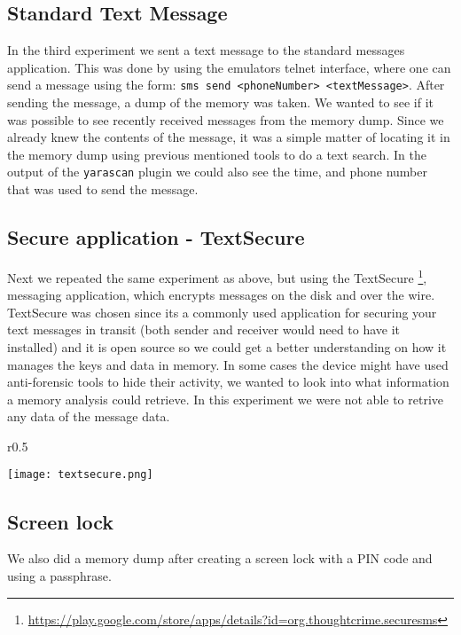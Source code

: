 \subsection{Standard Text Message}
In the third experiment we sent a text message to the standard messages application.
This was done by using the emulators telnet interface, where one can send a message
using the form: \texttt{sms send <phoneNumber> <textMessage>}. After sending the
message, a dump of the memory was taken. We wanted to see if it was possible to 
see recently received messages from the memory dump. Since we already knew the 
contents of the message, it was a simple matter of locating it in the memory 
dump using previous mentioned tools to do a text search. In the output of the
\texttt{yarascan} plugin we could also see the time, and phone number that was
used to send the message.
  
\subsection{Secure application - TextSecure}
Next we repeated the same experiment as above, but using the TextSecure
\footnote{\url{https://play.google.com/store/apps/details?id=org.thoughtcrime.securesms}}, 
messaging application, which encrypts messages on the disk and over the wire.
TextSecure was chosen since its a commonly used application for securing your 
text messages in transit (both sender and receiver would need to have it 
installed) and it is open source so we could get a better understanding on 
how it manages the keys and data in memory.  
In some cases the device might have used anti-forensic tools to hide their 
activity, we wanted to look into what information a memory analysis could 
retrieve. In this experiment we were not able to retrive any data of the message 
data.
\begin{wrapfigure}{r}{0.5\textwidth}
    \begin{center}
        \texttt{[image: textsecure.png]}
    \end{center}
    \vspace{-50pt}                                                                                                                                                                 
\end{wrapfigure}

\subsection{Screen lock}
We also did a memory dump after creating a screen lock with a PIN code and using a passphrase.

